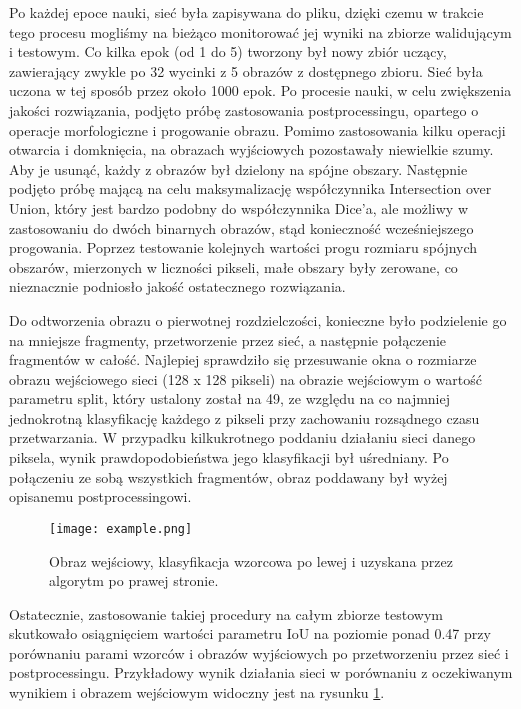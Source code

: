 \documentclass{article}
\begin{document}
Po każdej epoce nauki, sieć była zapisywana do pliku, dzięki czemu w trakcie tego procesu mogliśmy na bieżąco monitorować jej wyniki na zbiorze walidującym i testowym. Co kilka epok (od 1 do 5) tworzony był nowy zbiór uczący, zawierający zwykle po 32 wycinki z 5 obrazów z dostępnego zbioru. Sieć była uczona w tej sposób przez około 1000 epok. Po procesie nauki, w celu zwiększenia jakości rozwiązania, podjęto próbę zastosowania postprocessingu, opartego o operacje morfologiczne i progowanie obrazu. Pomimo zastosowania kilku operacji otwarcia i domknięcia, na obrazach wyjściowych pozostawały niewielkie szumy. Aby je usunąć, każdy z obrazów był dzielony na spójne obszary. Następnie podjęto próbę mającą na celu maksymalizację współczynnika Intersection over Union, który jest bardzo podobny do współczynnika Dice'a, ale możliwy w zastosowaniu do dwóch binarnych obrazów, stąd konieczność wcześniejszego progowania. Poprzez testowanie kolejnych wartości progu rozmiaru spójnych obszarów, mierzonych w liczności pikseli, małe obszary były zerowane, co nieznacznie podniosło jakość ostatecznego rozwiązania.

Do odtworzenia obrazu o pierwotnej rozdzielczości, konieczne było podzielenie go na mniejsze fragmenty, przetworzenie przez sieć, a następnie połączenie fragmentów w całość. Najlepiej sprawdziło się przesuwanie okna o rozmiarze obrazu wejściowego sieci (128 x 128 pikseli) na obrazie wejściowym o wartość parametru split, który ustalony został na 49, ze względu na co najmniej jednokrotną klasyfikację każdego z pikseli przy zachowaniu rozsądnego czasu przetwarzania. W przypadku kilkukrotnego poddaniu działaniu sieci danego piksela, wynik prawdopodobieństwa jego klasyfikacji był uśredniany. Po połączeniu ze sobą wszystkich fragmentów, obraz poddawany był wyżej opisanemu postprocessingowi.

\begin{figure}[H]
\begin{center}
\texttt{[image: example.png]}
\end{center}
\caption{Obraz wejściowy, klasyfikacja wzorcowa po lewej i uzyskana przez algorytm po prawej stronie.}
\label{fig:example}
\end{figure}

Ostatecznie, zastosowanie takiej procedury na całym zbiorze testowym skutkowało osiągnięciem wartości parametru IoU na poziomie ponad 0.47 przy porównaniu parami wzorców i obrazów wyjściowych po przetworzeniu przez sieć i postprocessingu. Przykładowy wynik działania sieci w porównaniu z oczekiwanym wynikiem i obrazem wejściowym widoczny jest na rysunku \ref{fig:example}.
\end{document}
